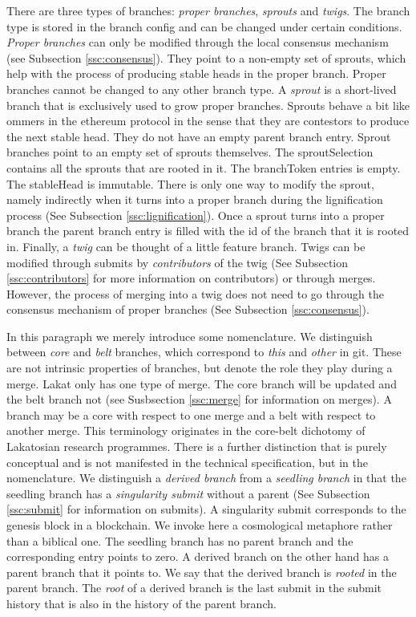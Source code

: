 \documentclass[14pt]{article}
\begin{document}
There are three types of branches: \textit{proper branches}, \textit{sprouts} and \textit{twigs}. The branch type is stored in the branch config and can be changed under certain conditions. 
\textit{Proper branches} can only be modified through the local consensus mechanism (see Subsection \ref{ssc:consensus}). They point to a non-empty set of sprouts, which help with the process of producing stable heads in the proper branch. Proper branches cannot be changed to any other branch type. A \textit{sprout} is a short-lived branch that is exclusively used to grow proper branches. Sprouts behave a bit like ommers in the ethereum protocol in the sense that they are contestors to produce the next stable head. They do not have an empty parent branch entry. Sprout branches point to an empty set of sprouts themselves. The sproutSelection contains all the sprouts that are rooted in it. The branchToken entries is empty. The stableHead is immutable. There is only one way to modify the sprout, namely indirectly when it turns into a proper branch during the lignification process (See Subsection \ref{ssc:lignification}). Once a sprout turns into a proper branch the parent branch entry is filled with the id of the branch that it is rooted in. Finally, a \textit{twig} can be thought of a little feature branch. Twigs can be modified through submits by \textit{contributors} of the twig (See Subsection \ref{ssc:contributors} for more information on contributors) or through merges. However, the process of merging into a twig does not need to go through the consensus mechanism of proper branches (See Subsection \ref{ssc:consensus}).

In this paragraph we merely introduce some nomenclature. We distinguish between \textit{core} and \textit{belt} branches, which correspond to \textit{this} and \textit{other} in git. These are not intrinsic properties of branches, but denote the role they play during a merge. Lakat only has one type of merge. The core branch will be updated and the belt branch not (see Susbsection \ref{ssc:merge} for information on merges). A branch may be a core with respect to one merge and a belt with respect to another merge. This terminology originates in the core-belt dichotomy of Lakatosian research programmes. There is a further distinction that is purely conceptual and is not manifested in the technical specification, but in the nomenclature. We distinguish a \textit{derived branch} from a \textit{seedling branch} in that the seedling branch has a \textit{singularity submit} without a parent (See Subsection \ref{ssc:submit} for information on submits). A singularity submit corresponds to the genesis block in a blockchain. We invoke here a cosmological metaphore rather than a biblical one. The seedling branch has no parent branch and the corresponding entry points to zero. A derived branch on the other hand has a parent branch that it points to. We say that the derived branch is \textit{rooted} in the parent branch. The \textit{root} of a derived branch is the last submit in the submit history that is also in the history of the parent branch.
\end{document}
